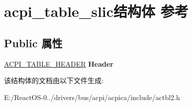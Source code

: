 \hypertarget{structacpi__table__slic}{}\section{acpi\+\_\+table\+\_\+slic结构体 参考}
\label{structacpi__table__slic}
\subsection*{Public 属性}
\begin{DoxyCompactItemize}
\item 
\mbox{\label{structacpi__table__slic_a2a56e0e6403eac98da15a0bb38715f8f}} 
\hyperlink{structacpi__table__header}{A\+C\+P\+I\+\_\+\+T\+A\+B\+L\+E\+\_\+\+H\+E\+A\+D\+ER} {\bfseries Header}
\end{DoxyCompactItemize}


该结构体的文档由以下文件生成\+:\begin{DoxyCompactItemize}
\item 
E\+:/\+React\+O\+S-\/0../drivers/bus/acpi/acpica/include/actbl2.\+h\end{DoxyCompactItemize}
